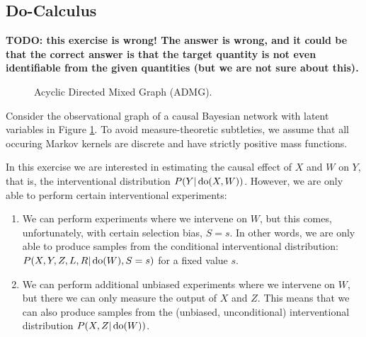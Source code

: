 \subsection{Do-Calculus}

\textbf{TODO: this exercise is wrong! The answer is wrong, and it could be that the correct answer is that the target
quantity is not even identifiable from the given quantities (but we are not sure about this).}

\begin{figure}[ht]
\centering
{}
\caption{Acyclic Directed Mixed Graph (ADMG).}
\label{fig:cadmg-1}
\end{figure}

\noindent Consider the observational graph of a causal Bayesian network with latent variables in Figure \ref{fig:cadmg-1}.
To avoid measure-theoretic subtleties, we assume that all occuring Markov kernels are discrete and have strictly positive mass functions.

In this exercise we are interested in estimating the causal effect of $X$ and $W$ on $Y$, that is, the interventional distribution $P(Y|\operatorname{do}(X,W))$. However, we are only able to perform certain interventional experiments:
\begin{enumerate}[label=(\arabic*)]
    \item We can perform experiments where we intervene on $W$, but this comes, unfortunately, with certain selection bias, $S=s$. In other words, we are only able to produce samples from the conditional interventional distribution: $P(X,Y,Z,L,R|\operatorname{do}(W),S=s)$ for a fixed value $s$.
    \item We can perform additional unbiased experiments where we intervene on $W$, but there we can only measure the output of $X$ and $Z$. This means that we can also produce samples from the (unbiased, unconditional)  interventional distribution $P(X,Z|\operatorname{do}(W))$.
\end{enumerate}

